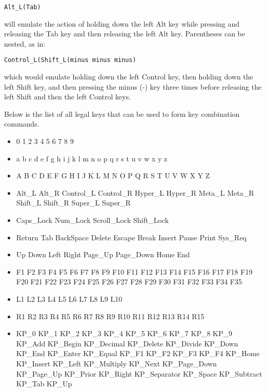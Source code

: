 \documentclass[11pt]{article}
\newcommand{\code}[1]{\texttt{#1}}
\begin{document}
\code{Alt\_L(Tab)}

will emulate the action of holding down the left Alt key while
pressing and releasing the Tab key and then releasing the left Alt
key. Parentheses can be nested, as in:

\code{Control\_L(Shift\_L(minus minus minus)}

which would emulate holding down the left Control key, then holding
down the left Shift key, and then pressing the minus (-) key three
times before releasing the left Shift and then the left Control
keys. 

Below is the list of all legal keys that can be used to form key
combination commands.

\begin{itemize}

\item 0 1 2 3 4 5 6 7 8 9

\item a b c d e f g h i j k l m n o p q r s t u v w x y z

\item A B C D E F G H I J K L M N O P Q R S T U V W X Y Z

\item Alt\_L Alt\_R Control\_L Control\_R Hyper\_L Hyper\_R Meta\_L
  Meta\_R Shift\_L Shift\_R Super\_L Super\_R

\item Caps\_Lock Num\_Lock Scroll\_Lock Shift\_Lock

\item Return Tab BackSpace Delete Escape Break Insert Pause Print Sys\_Req

\item Up Down Left Right Page\_Up Page\_Down Home End

\item F1 F2 F3 F4 F5 F6 F7 F8 F9 F10 F11 F12 F13 F14 F15 F16 F17 F18
  F19 F20 F21 F22 F23 F24 F25 F26 F27 F28 F29 F30 F31 F32 F33 F34 F35

\item L1 L2 L3 L4 L5 L6 L7 L8 L9 L10

\item R1 R2 R3 R4 R5 R6 R7 R8 R9 R10 R11 R12 R13 R14 R15

\item KP\_0 KP\_1 KP\_2 KP\_3 KP\_4 KP\_5 KP\_6 KP\_7 KP\_8 KP\_9
  KP\_Add KP\_Begin KP\_Decimal KP\_Delete KP\_Divide KP\_Down KP\_End
  KP\_Enter KP\_Equal KP\_F1 KP\_F2 KP\_F3 KP\_F4 KP\_Home KP\_Insert
  KP\_Left KP\_Multiply KP\_Next KP\_Page\_Down KP\_Page\_Up KP\_Prior
  KP\_Right KP\_Separator KP\_Space KP\_Subtract KP\_Tab KP\_Up


\end{itemize}
\end{document}
